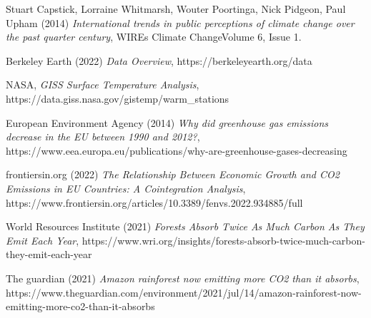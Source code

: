 \begin{thebibliography}{9}

Stuart Capstick, Lorraine Whitmarsh, Wouter Poortinga, Nick Pidgeon, Paul Upham (2014) \emph{International trends in public perceptions of climate change over the past quarter century}, WIREs Climate ChangeVolume 6, Issue 1.

Berkeley Earth (2022) \emph{Data Overview}, https://berkeleyearth.org/data

NASA, \emph{GISS Surface Temperature Analysis}, https://data.giss.nasa.gov/gistemp/warm\_stations

European Environment Agency (2014) \emph{Why did greenhouse gas emissions decrease in the EU between 1990 and 2012?}, https://www.eea.europa.eu/publications/why-are-greenhouse-gases-decreasing

frontiersin.org (2022) \emph{The Relationship Between Economic Growth and CO2 Emissions in EU Countries: A Cointegration Analysis}, https://www.frontiersin.org/articles/10.3389/fenvs.2022.934885/full 

World Resources Institute (2021) \emph{Forests Absorb Twice As Much Carbon As They Emit Each Year}, https://www.wri.org/insights/forests-absorb-twice-much-carbon-they-emit-each-year 

The guardian (2021) \emph{Amazon rainforest now emitting more CO2 than it absorbs}, https://www.theguardian.com/environment/2021/jul/14/amazon-rainforest-now-emitting-more-co2-than-it-absorbs

\end{thebibliography}